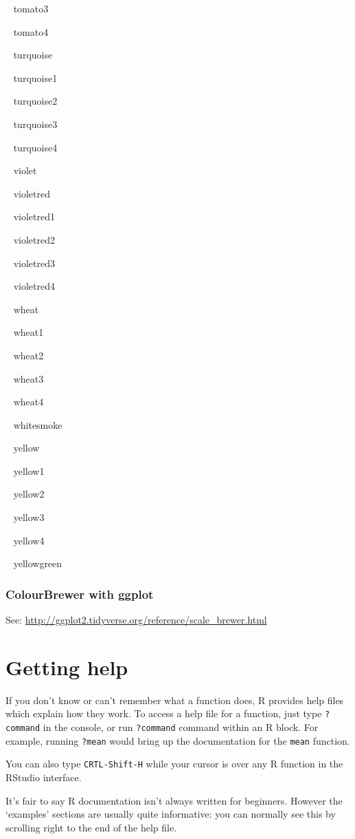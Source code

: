 \documentclass[]{article}
\theoremstyle{definition}
\theoremstyle{definition}
\theoremstyle{definition}
\theoremstyle{remark}
\begin{document}
{~} tomato3

{~} tomato4

{~} turquoise

{~} turquoise1

{~} turquoise2

{~} turquoise3

{~} turquoise4

{~} violet

{~} violetred

{~} violetred1

{~} violetred2

{~} violetred3

{~} violetred4

{~} wheat

{~} wheat1

{~} wheat2

{~} wheat3

{~} wheat4

{~} whitesmoke

{~} yellow

{~} yellow1

{~} yellow2

{~} yellow3

{~} yellow4

{~} yellowgreen

\hypertarget{color-brewer}{\subsubsection*{ColourBrewer with
ggplot}\label{color-brewer}}

See: \url{http://ggplot2.tidyverse.org/reference/scale_brewer.html}

\section{Getting help}\label{getting-help}

If you don't know or can't remember what a function does, R provides
help files which explain how they work. To access a help file for a
function, just type \texttt{?command} in the console, or run
\texttt{?command} command within an R block. For example, running
\texttt{?mean} would bring up the documentation for the \texttt{mean}
function.

You can also type \texttt{CRTL-Shift-H} while your cursor is over any R
function in the RStudio interface.

It's fair to say R documentation isn't always written for beginners.
However the `examples' sections are usually quite informative: you can
normally see this by scrolling right to the end of the help file.
\end{document}
